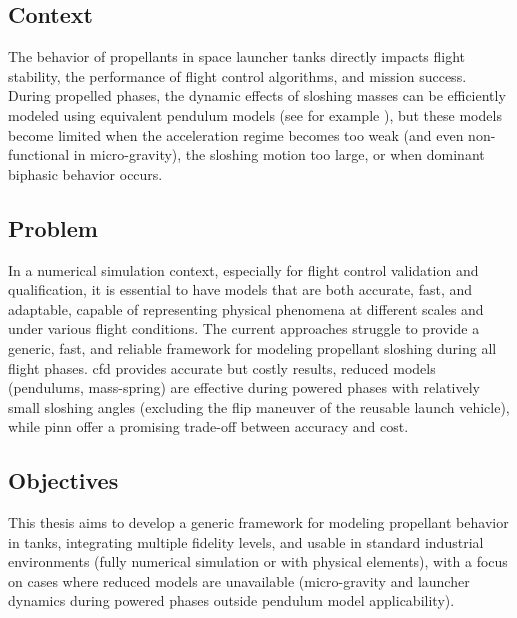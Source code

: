 \documentclass[12pt]{article}
\begin{document}
	\subsection*{Context}
	
	The behavior of propellants in space launcher tanks directly impacts flight stability, the performance of flight control algorithms, and mission success. During propelled phases, the dynamic effects of sloshing masses can be efficiently modeled using equivalent pendulum models (see for example \cite{ibrahimLiquidSloshingDynamics2005a}), but these models become limited when the acceleration regime becomes too weak (and even non-functional in micro-gravity), the sloshing motion too large, or when dominant biphasic behavior occurs.
	
	\subsection*{Problem}
	
	In a numerical simulation context, especially for flight control validation and qualification, it is essential to have models that are both accurate, fast, and adaptable, capable of representing physical phenomena at different scales and under various flight conditions.
	The current approaches struggle to provide a generic, fast, and reliable framework for modeling propellant sloshing during all flight phases. \acrshort{cfd} provides accurate but costly results, reduced models (pendulums, mass-spring) are effective during powered phases with relatively small sloshing angles (excluding the flip maneuver of the reusable launch vehicle), while \gls{pinn} offer a promising trade-off between accuracy and cost.
	
	\subsection*{Objectives}
	
	This thesis aims to develop a generic framework for modeling propellant behavior in tanks, integrating multiple fidelity levels, and usable in standard industrial environments (fully numerical simulation or with physical elements), with a focus on cases where reduced models are unavailable (micro-gravity and launcher dynamics during powered phases outside pendulum model applicability).
	
\end{document}
